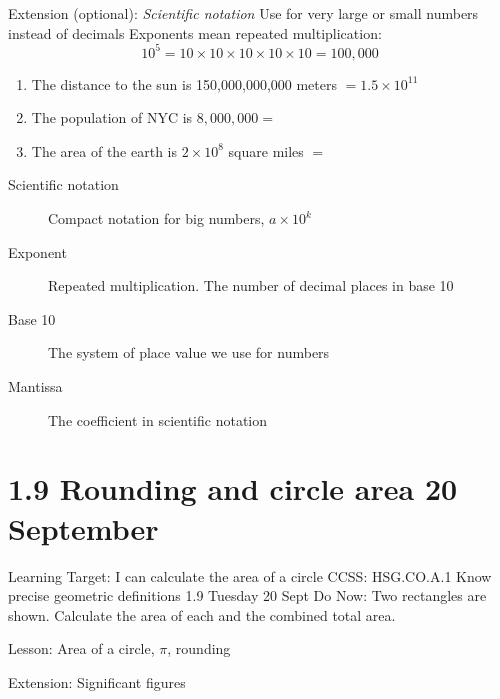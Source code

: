 \begin{frame}{Extension (optional): \emph{Scientific notation}}
    {Use for very large or small numbers instead of decimals}
    Exponents mean repeated multiplication:
        $$10^5 = 10 \times 10 \times 10 \times 10 \times 10 = 100,000$$
    \begin{enumerate}
        \item The distance to the sun is 150,000,000,000 meters $=1.5 \times 10^{11}$
        \item The population of NYC is $8,000,000 = $ \bigskip
        \item The area of the earth is $2 \times 10^{8}$ square miles $=$
    \end{enumerate} \bigskip
    \begin{description}
        \item[Scientific notation] Compact notation for big numbers, $a \times 10^k$
        \item[Exponent] Repeated multiplication. The number of decimal places in base 10
        \item[Base 10] The system of place value we use for numbers
        \item[Mantissa] The coefficient in scientific notation
    \end{description}
    \end{frame}

\section{1.9 Rounding and circle area \hfill 20 September}
\begin{frame}{Learning Target: I can calculate the area of a circle}
    {CCSS: HSG.CO.A.1 Know precise geometric definitions \hfill \alert{1.9 Tuesday 20 Sept}}
        Do Now: Two rectangles are shown. Calculate the area of each and the combined total area.
        \begin{flushleft}
          \end{flushleft}
        Lesson: Area of a circle, $\pi$, rounding \par \medskip
        Extension: Significant figures
    \end{frame}

